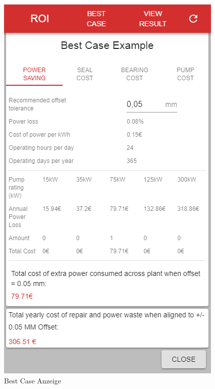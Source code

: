 \documentclass{article}
\begin{document}
\begin{figure}
				\includegraphics[scale=0.38]{Bilder/17.png}
				\centering
				\vspace{0 cm}
				\caption{Best Case Anzeige}
				\label{fig23}	
				

\end{figure}
\end{document}
